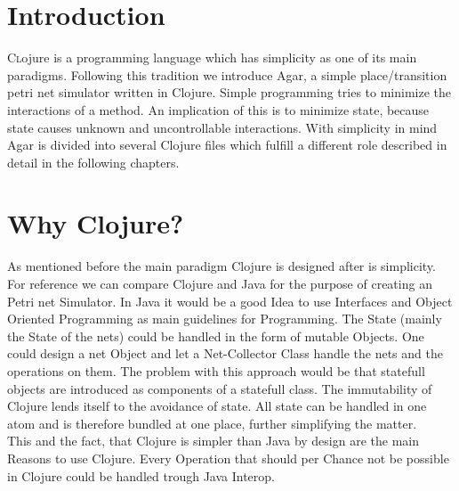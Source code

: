 \documentclass[twoside]{article}
\begin{document}
\begin{multicols}{2} %


\section{Introduction}

\lettrine[nindent=0em,lines=3]{C} lojure is a programming language which has simplicity as one of its main paradigms.
Following this tradition we introduce Agar, a simple place/transition petri net simulator written in Clojure.
Simple programming tries to minimize the interactions of a method. An implication of this is to minimize
state, because state causes unknown and uncontrollable interactions.
With simplicity in mind Agar is divided into several Clojure files which fulfill a different role described in detail 
in the following chapters. 


\section{Why Clojure?}
As mentioned before the main paradigm Clojure is designed after is simplicity. For reference we can compare Clojure
and Java for the purpose of creating an Petri net Simulator. In Java it would be a good Idea to use Interfaces and Object
Oriented Programming as main guidelines for Programming. The State (mainly the State of the nets) could be handled in 
the form of mutable Objects. One could design a net Object and let a Net-Collector Class handle the nets and the operations
on them. The problem with this approach would be that statefull objects are introduced as components of a statefull class.
The immutability of Clojure lends itself to the avoidance of state. All state can be handled in one atom and is therefore bundled 
at one place, further simplifying the matter. \\
This and the fact, that Clojure is simpler than Java by design are the main Reasons to use Clojure. Every Operation that should per Chance
not be possible in Clojure could be handled trough Java Interop. 


\end{multicols}
\end{document}
